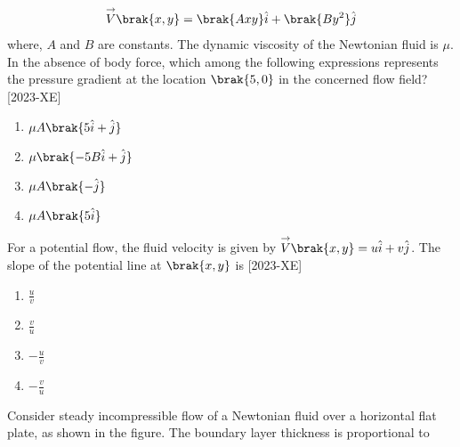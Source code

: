 \begin{align*}
    \overset{\rightarrow}{V} \brak{x,y} = \brak{Axy} \hat{i} + \brak{By^2} \hat{j}
\end{align*}
where, $A$ and $B$ are constants. The dynamic viscosity of the Newtonian fluid is $\mu$. In the absence of body force, which among the following expressions represents the pressure gradient at the location $\brak{5,0}$ in the concerned flow field? \hfill{[2023-XE]}\\
\begin{enumerate}
    \item $\mu A \brak{5 \hat{i}+\hat{j}}$\\
    \item $\mu \brak{-5B \hat{i}+\hat{j}}$\\
    \item $\mu A \brak{-\hat{j}}$\\
    \item $\mu A \brak{5 \hat{i}}$
\end{enumerate}
\item For a potential flow, the fluid velocity is given by $\overset{\rightarrow}{V} \brak{x,y}=u \hat{i}+v \hat{j}$. The slope of the potential line at $\brak{x,y}$ is \hfill{[2023-XE]}\\
\begin{enumerate}
    \item $\frac{u}{v}$\\
    \item $\frac{v}{u}$\\
    \item $-\frac{u}{v}$\\
    \item $-\frac{v}{u}$\\
\end{enumerate}
\item Consider steady incompressible flow of a Newtonian fluid over a horizontal flat plate, as shown in the figure. The boundary layer thickness is proportional to 

